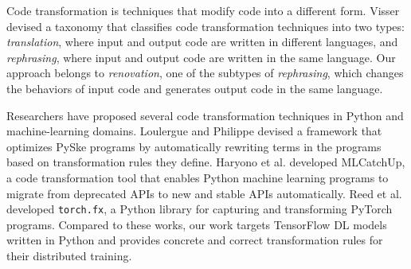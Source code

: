 Code transformation is techniques that modify code into a different form.  
Visser devised a taxonomy\cite{Visser2001} that classifies code transformation
techniques into two types: 
\textit{translation}, where input and output code are written in different
languages, and \textit{rephrasing}, where input and output code are written in
the same language.
Our approach belongs to \textit{renovation}, one of the subtypes of
\textit{rephrasing}, which changes the behaviors of input code and generates
output code in the same language.


Researchers have proposed several code transformation techniques in Python
and machine-learning domains.
Loulergue and Philippe\cite{Loulergue2020} devised a framework that optimizes
PySke programs by automatically rewriting terms in the programs based on
transformation rules they define.
Haryono et al. \cite{mlcatchup} developed MLCatchUp, a code transformation tool
that enables Python machine learning programs to migrate from deprecated APIs
to new and stable APIs automatically. 
Reed et al. \cite{torchfx} developed {\tt torch.fx}, a Python library for
capturing and transforming PyTorch programs.
Compared to these works, our work targets TensorFlow DL models written in
Python and provides concrete and correct transformation rules for their
distributed training.

